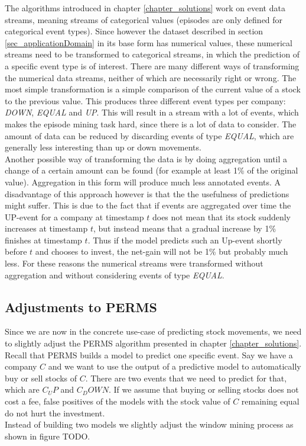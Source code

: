 The algorithms introduced in chapter \ref{chapter_solutions} work on event data streams, meaning streams of categorical values (episodes are only defined for categorical event types). Since however the dataset described in section \ref{sec_applicationDomain} in its base form has numerical values, these numerical streams need to be transformed to categorical streams, in which the prediction of a specific event type is of interest. There are many different ways of transforming the numerical data streams, neither of which are necessarily right or wrong. The most simple transformation is a simple comparison of the current value of a stock to the previous value. This produces three different event types per company: \textit{DOWN}, \textit{EQUAL} and \textit{UP}. This will result in a stream with a lot of events, which makes the episode mining task hard, since there is a lot of data to consider. The amount of data can be reduced by discarding events of type \textit{EQUAL}, which are generally less interesting than up or down movements. \\
Another possible way of transforming the data is by doing aggregation until a change of a certain amount can be found (for example at least 1\% of the original value). Aggregation in this form will produce much less annotated events. A disadvantage of this approach however is that the the usefulness of predictions might suffer. This is due to the fact that if events are aggregated over time the UP-event for a company at timestamp $t$ does not mean that its stock suddenly increases at timestamp $t$, but instead means that a gradual increase by 1\% finishes at timestamp $t$. Thus if the model predicts such an Up-event shortly before $t$ and chooses to invest, the net-gain will not be 1\% but probably much less. For these reasons the numerical streams were transformed without aggregation and without considering events of type \textit{EQUAL}.

\subsection{Adjustments to PERMS}
Since we are now in the concrete use-case of predicting stock movements, we need to slightly adjust the PERMS algorithm presented in chapter \ref{chapter_solutions}. Recall that PERMS builds a model to predict one specific event. Say we have a company $C$ and we want to use the output of a predictive model to automatically buy or sell stocks of $C$. There are two events that we need to predict for that, which are $C_UP$ and $C_DOWN$. If we assume that buying or selling stocks does not cost a fee, false positives of the models with the stock value of $C$ remaining equal do not hurt the investment. \\
Instead of building two models we slightly adjust the window mining process as shown in figure TODO.

